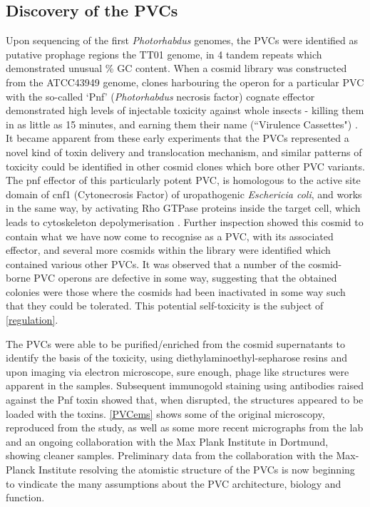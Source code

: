 \subsection{Discovery of the PVCs}
Upon sequencing of the first \emph{Photorhabdus} genomes, the PVCs were identified as putative prophage regions the \Plum{} TT01 genome, in 4 tandem repeats which demonstrated unusual \% GC content. When a cosmid library was constructed from the \Pasy{} ATCC43949 genome, clones harbouring the operon for a particular PVC with the so-called `Pnf' (\emph{Photorhabdus} necrosis factor) cognate effector demonstrated high levels of injectable toxicity against whole insects - killing them in as little as 15 minutes, and earning them their name (``Virulence Cassettes") \citep{Yang2006, Waterfield2008}. It became apparent from these early experiments that the PVCs represented a novel kind of toxin delivery and translocation mechanism, and similar patterns of toxicity could be identified in other cosmid clones which bore other PVC variants. The pnf effector of this particularly potent PVC, is homologous to the active site domain of cnf1 (Cytonecrosis Factor) of uropathogenic \emph{Eschericia coli}, and works in the same way, by activating Rho GTPase proteins inside the target cell, which leads to cytoskeleton depolymerisation \citep{Landraud2004, Buetow2001}. Further inspection showed this cosmid to contain what we have now come to recognise as a PVC, with its associated effector, and several more cosmids within the library were identified which contained various other PVCs. It was observed that a number of the cosmid-borne PVC operons are defective in some way, suggesting that the obtained colonies were those where the cosmids had been inactivated in some way such that they could be tolerated. This potential self-toxicity is the subject of \vref{regulation}.

The PVCs were able to be purified/enriched from the cosmid supernatants to identify the basis of the toxicity, using diethylaminoethyl-sepharose resins and upon imaging via electron microscope, sure enough, phage like structures were apparent in the samples. Subsequent immunogold staining using antibodies raised against the Pnf toxin showed that, when disrupted, the structures appeared to be loaded with the toxins. \vref{PVCems} shows some of the original microscopy, reproduced from the \cite{Yang2006} study, as well as some more recent micrographs from the lab and an ongoing collaboration with the Max Plank Institute in Dortmund, showing cleaner samples. Preliminary data from the collaboration with the Max-Planck Institute resolving the atomistic structure of the PVCs is now beginning to vindicate the many assumptions about the PVC architecture, biology and function.

